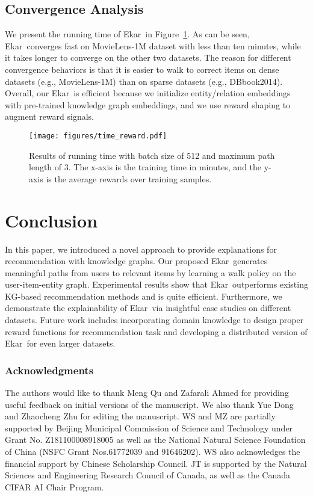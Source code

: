 \documentclass{article}
\newcommand{\name}{Ekar}
\begin{document}
\subsection{Convergence Analysis}
We present the running time of \name\ in Figure~\ref{fig::time_reward}. As can be seen, \name\ converges fast on MovieLens-1M dataset with less than ten minutes, while it takes longer to converge on the other two datasets. The reason for different convergence behaviors is that it is easier to walk to correct items on dense datasets (e.g., MovieLens-1M) than on sparse datasets (e.g., DBbook2014). Overall, our \name\ is efficient because we initialize entity/relation embeddings with pre-trained knowledge graph embeddings, and we use reward shaping to augment reward signals.


\begin{figure}
\texttt{[image: figures/time\_reward.pdf]}
\caption{Results of running time with batch size of 512 and maximum path length of 3. The x-axis is the training time in minutes, and the y-axis is the average rewards over training samples.
}\label{fig::time_reward}
\end{figure}
 \section{Conclusion}
In this paper, we introduced a novel approach to provide explanations for recommendation with knowledge graphs.
Our proposed \name\ generates meaningful paths from users to relevant items by learning a walk policy on the user-item-entity graph.
Experimental results show that \name\ outperforms existing KG-based recommendation methods and is quite efficient. Furthermore, we demonstrate the explainability of \name\ via insightful case studies on different datasets. Future work includes incorporating domain knowledge to design proper reward functions for recommendation task and developing a distributed version of \name\ for even larger datasets.
%
 \subsubsection*{Acknowledgments}
The authors would like to thank Meng Qu and Zafarali Ahmed for providing useful feedback on initial versions of the manuscript. We also thank Yue Dong and Zhaocheng Zhu for editing the manuscript. WS and MZ are partially supported by Beijing Municipal Commission of Science and Technology under Grant No. Z181100008918005 as well as the National Natural Science Foundation of China (NSFC Grant Nos.61772039 and 91646202). WS also acknowledges the financial support by Chinese Scholarship Council. JT is supported by the Natural Sciences and Engineering Research Council of Canada, as well as the Canada CIFAR AI Chair Program.
\end{document}
